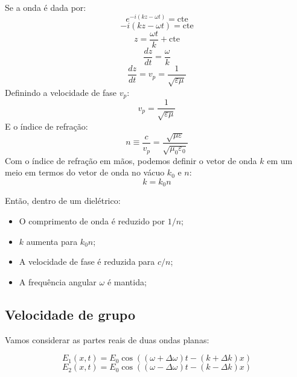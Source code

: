\documentclass[12pt,a4paper]{report}
\begin{document}
Se a onda é dada por:
\begin{equation*}
    e^{-i(kz-\omega t)}=\text{cte}
\end{equation*}
\begin{equation*}
    -i(kz-\omega t)=\text{cte}
\end{equation*}
\begin{equation*}
    z=\frac{\omega t}{k}+\text{cte}
\end{equation*}
\begin{equation*}
    \frac{dz}{dt}=\frac{\omega}{k}
\end{equation*}
\begin{equation*}
    \frac{dz}{dt}=v_p=\frac{1}{\sqrt{\varepsilon\mu}}
\end{equation*}
Definindo a velocidade de fase $v_p$:
\begin{equation*}
    v_p=\frac{1}{\sqrt{\varepsilon\mu}}
\end{equation*}
E o índice de refração:
\begin{equation}
    n\equiv\frac{c}{v_p}=\frac{\sqrt{\mu\varepsilon}}{\sqrt{\mu_0\varepsilon_0}}
\end{equation}
Com o índice de refração em mãos, podemos definir o vetor de onda $k$ em um meio em termos do vetor de onda no vácuo $k_0$ e $n$:
\begin{equation}
    k=k_0n
\end{equation}

Então, dentro de um dielétrico:
\begin{itemize}
    \item O comprimento de onda é reduzido por $1/n$;
    \item $k$ aumenta para $k_0n$;
    \item A velocidade de fase é reduzida para $c/n$;
    \item A frequência angular $\omega$ é mantida;
\end{itemize}

\subsection{Velocidade de grupo}

Vamos considerar as partes reais de duas ondas planas:

\begin{equation*}
    E_1(x,t)=E_0\cos((\omega+\Delta\omega)t-(k+\Delta k)x)
\end{equation*}
\begin{equation*}
    E_2(x,t)=E_0\cos((\omega-\Delta\omega)t-(k-\Delta k)x)
\end{equation*}
\end{document}
